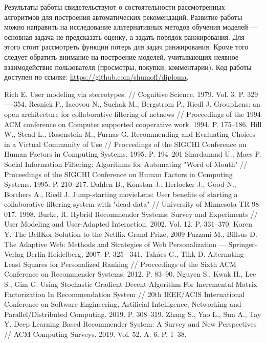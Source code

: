 \documentclass[a4paper,article,14pt]{extarticle}
\begin{document}
\pagebreak
{}
Результаты работы свидетельствуют о состоятельности рассмотренных алгоритмов для построения автоматических рекомендаций.
Развитие работы можно направить на исследование альтернативных методов обучения моделей --- основная задача не предсказать оценку, а задать порядок ранжирования.
Для этого стоит рассмотреть функции потерь для задач ранжирования.
Кроме того следует обратить внимание на построение моделей, учитывающих неявное взаимодействие пользователя (просмотры, покупки, комментарии).
Код работы доступен по ссылке: \url{https://github.com/shumoff/diploma}.

\pagebreak

\begin{thebibliography}{1}
 Rich E. User modeling via stereotypes. // Cognitive Science. 1979. Vol. 3. P. 329—-354.
 Resnick P., Iacovou N., Suchak M., Bergstrom P., Riedl J. GroupLens: an open architecture for collaborative filtering of netnews // Proceedings of the 1994 ACM conference on Computer supported cooperative work. 1994. P. 175--186.
 Hill W., Stead L., Rosenstein M., Furnas G. Recommending and Evaluating Choices in a Virtual Community of Use // Proceedings of the SIGCHI Conference on Human Factors in Computing Systems. 1995. P. 194--201
 Shardanand U., Maes P. Social Information Filtering: Algorithms for Automating "Word of Mouth" // Proceedings of the SIGCHI Conference on Human Factors in Computing Systems. 1995. P. 210--217.
 Dahlen B., Konstan J., Herlocker J., Good N., Borchers A., Riedl J. Jump-starting movieLens: User benefits of starting a collaborative filtering system with "dead-data" // University of Minnesota TR 98-017. 1998.
 Burke, R. Hybrid Recommender Systems: Survey and Experiments // User Modeling and User-Adapted Interaction. 2002. Vol. 12. P. 331--370.
 Koren Y. The BellKor Solution to the Netflix Grand Prize, 2009
 Pazzani M., Billsus D. The Adaptive Web: Methods and Strategies of Web Personalization --- Springer-Verlag Berlin Heidelberg, 2007. P. 325–-341.
 Takács G., Tikk D. Alternating Least Squares for Personalized Ranking // Proceedings of the Sixth ACM Conference on Recommender Systems. 2012. P. 83--90.
 Nguyen S., Kwak H., Lee S., Gim G. Using Stochastic Gradient Decent Algorithm For Incremental Matrix Factorization In Recommendation System // 20th IEEE/ACIS International Conference on Software Engineering, Artificial Intelligence, Networking and Parallel/Distributed Computing. 2019. P. 308--319.
 Zhang S., Yao L., Sun A., Tay Y. Deep Learning Based Recommender System: A Survey and New Perspectives // ACM Computing Surveys. 2019. Vol. 52. A. 6. P. 1--38.


\end{thebibliography}
\end{document}
